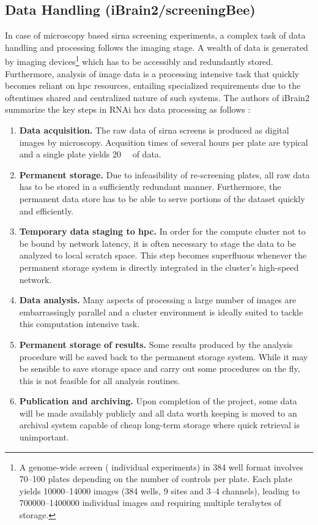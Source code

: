 \subsection{Data Handling (iBrain2\slash screeningBee)}
In case of microscopy based \gls{sirna} screening experiments, a complex task of data handling and processing follows the imaging stage. A wealth of data is generated by imaging devices\footnote{A genome-wide screen ( individual experiments) in 384 well format involves 70--100 plates depending on the number of controls per plate. Each plate yields 10000--14000 images (384 wells, 9 sites and 3--4 channels), leading to 700000--1400000 individual images and requiring multiple terabytes of storage.} which has to be accessibly and redundantly stored. Furthermore, analysis of image data is a processing intensive task that quickly becomes reliant on \gls{hpc} resources, entailing specialized requirements due to the oftentimes shared and centralized nature of such systems. The authors of iBrain2 summarize the key steps in RNAi \gls{hcs} data processing as follows \citep{Rouilly2012}:
\begin{enumerate}
\item \textbf{Data acquisition.} The raw data of \gls{sirna} screens is produced as digital images by microscopy. Acqusition times of several hours per plate are typical and a single plate yields \tilde \SI{20}{\giga\byte} of data.
\item \textbf{Permanent storage.} Due to infeasibility of re-screening plates, all raw data has to be stored in a sufficiently redundant manner. Furthermore, the permanent data store has to be able to serve portions of the dataset quickly and efficiently.
\item \textbf{Temporary data staging to \gls{hpc}.} In order for the compute cluster not to be bound by network latency, it is often necessary to stage the data to be analyzed to local scratch space. This step becomes superfluous whenever the permanent storage system is directly integrated in the cluster's high-speed network.
\item \textbf{Data analysis.} Many aspects of processing a large number of images are embarrassingly parallel and a cluster environment is ideally suited to tackle this computation intensive task.
\item \textbf{Permanent storage of results.} Some results produced by the analysis procedure will be saved back to the permanent storage system. While it may be sensible to save storage space and carry out some procedures on the fly, this is not feasible for all analysis routines.
\item \textbf{Publication and archiving.} Upon completion of the project, some data will be made availably publicly and all data worth keeping is moved to an archival system capable of cheap long-term storage where quick retrieval is unimportant.
\end{enumerate}


